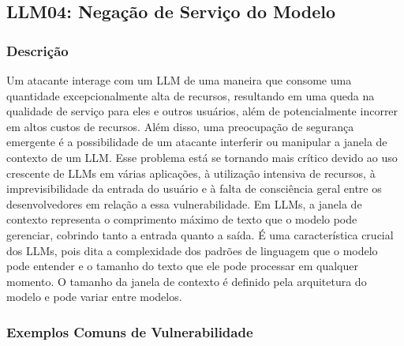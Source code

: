 \documentclass[
]{article}
\author{}
\date{}
\begin{document}
\subsection{LLM04: Negação de Serviço do
Modelo}\label{llm04-negauxe7uxe3o-de-serviuxe7o-do-modelo}

\subsubsection{Descrição}\label{descriuxe7uxe3o}

Um atacante interage com um LLM de uma maneira que consome uma
quantidade excepcionalmente alta de recursos, resultando em uma queda na
qualidade de serviço para eles e outros usuários, além de potencialmente
incorrer em altos custos de recursos. Além disso, uma preocupação de
segurança emergente é a possibilidade de um atacante interferir ou
manipular a janela de contexto de um LLM. Esse problema está se tornando
mais crítico devido ao uso crescente de LLMs em várias aplicações, à
utilização intensiva de recursos, à imprevisibilidade da entrada do
usuário e à falta de consciência geral entre os desenvolvedores em
relação a essa vulnerabilidade. Em LLMs, a janela de contexto representa
o comprimento máximo de texto que o modelo pode gerenciar, cobrindo
tanto a entrada quanto a saída. É uma característica crucial dos LLMs,
pois dita a complexidade dos padrões de linguagem que o modelo pode
entender e o tamanho do texto que ele pode processar em qualquer
momento. O tamanho da janela de contexto é definido pela arquitetura do
modelo e pode variar entre modelos.

\subsubsection{Exemplos Comuns de
Vulnerabilidade}\label{exemplos-comuns-de-vulnerabilidade}
\end{document}
